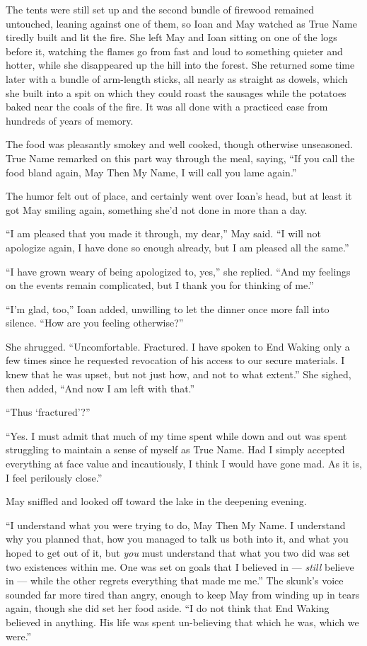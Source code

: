 The tents were still set up and the second bundle of firewood remained untouched, leaning against one of them, so Ioan and May watched as True Name tiredly built and lit the fire. She left May and Ioan sitting on one of the logs before it, watching the flames go from fast and loud to something quieter and hotter, while she disappeared up the hill into the forest. She returned some time later with a bundle of arm-length sticks, all nearly as straight as dowels, which she built into a spit on which they could roast the sausages while the potatoes baked near the coals of the fire. It was all done with a practiced ease from hundreds of years of memory.

The food was pleasantly smokey and well cooked, though otherwise unseasoned. True Name remarked on this part way through the meal, saying, ``If you call the food bland again, May Then My Name, I will call you lame again.''

The humor felt out of place, and certainly went over Ioan's head, but at least it got May smiling again, something she'd not done in more than a day.

``I am pleased that you made it through, my dear,'' May said. ``I will not apologize again, I have done so enough already, but I am pleased all the same.''

``I have grown weary of being apologized to, yes,'' she replied. ``And my feelings on the events remain complicated, but I thank you for thinking of me.''

``I'm glad, too,'' Ioan added, unwilling to let the dinner once more fall into silence. ``How are you feeling otherwise?''

She shrugged. ``Uncomfortable. Fractured. I have spoken to End Waking only a few times since he requested revocation of his access to our secure materials. I knew that he was upset, but not just how, and not to what extent.'' She sighed, then added, ``And now I am left with that.''

``Thus `fractured'?''

``Yes. I must admit that much of my time spent while down and out was spent struggling to maintain a sense of myself as True Name. Had I simply accepted everything at face value and incautiously, I think I would have gone mad. As it is, I feel perilously close.''

May sniffled and looked off toward the lake in the deepening evening.

``I understand what you were trying to do, May Then My Name. I understand why you planned that, how you managed to talk us both into it, and what you hoped to get out of it, but \emph{you} must understand that what you two did was set two existences within me. One was set on goals that I believed in — \emph{still} believe in — while the other regrets everything that made me me.'' The skunk's voice sounded far more tired than angry, enough to keep May from winding up in tears again, though she did set her food aside. ``I do not think that End Waking believed in anything. His life was spent un-believing that which he was, which we were.''

